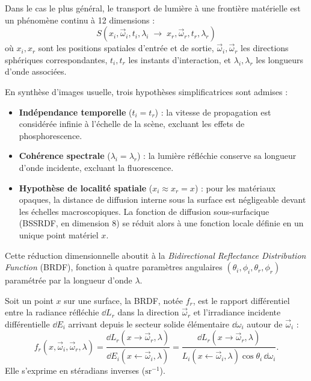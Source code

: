 Dans le cas le plus général, le transport de lumière à une frontière matérielle est un phénomène continu à 12 dimensions :
\begin{equation}
    S(x_i, \vec{\omega}_i, t_i, \lambda_i \;\to\; x_r, \vec{\omega}_r, t_r, \lambda_r)
\end{equation}
où $x_i, x_r$ sont les positions spatiales d'entrée et de sortie, $\vec{\omega}_i, \vec{\omega}_r$ les directions sphériques correspondantes, $t_i, t_r$ les instants d'interaction, et $\lambda_i, \lambda_r$ les longueurs d'onde associées.

\begin{proposition}[Simplification]
    En synthèse d'images usuelle, trois hypothèses simplificatrices sont admises :
    \begin{itemize}
        \item \textbf{Indépendance temporelle} ($t_i = t_r$) : la vitesse de propagation est considérée infinie à l'échelle de la scène, excluant les effets de phosphorescence.
        \item \textbf{Cohérence spectrale} ($\lambda_i = \lambda_r$) : la lumière réfléchie conserve sa longueur d'onde incidente, excluant la fluorescence.
        \item \textbf{Hypothèse de localité spatiale} ($x_i \approx x_r = x$) : pour les matériaux opaques, la distance de diffusion interne sous la surface est négligeable devant les échelles macroscopiques. La fonction de diffusion sous-surfacique (BSSRDF, en dimension 8) se réduit alors à une fonction locale définie en un unique point matériel $x$.
    \end{itemize}    
\end{proposition}

Cette réduction dimensionnelle aboutit à la \emph{Bidirectional Reflectance Distribution Function} (BRDF), fonction à quatre paramètres angulaires $(\theta_i, \phi_i, \theta_r, \phi_r)$ paramétrée par la longueur d'onde $\lambda$.

\begin{definition}[BRDF]
    Soit un point $x$ sur une surface, la BRDF, notée $f_r$, est le rapport différentiel entre la radiance réfléchie $\dd L_r$ dans la direction $\vec{\omega}_r$ et l'irradiance incidente différentielle $\dd E_i$ arrivant depuis le secteur solide élémentaire $\dd\omega_i$ autour de $\vec{\omega}_i$ :
    \begin{equation}
        f_r(x, \vec{\omega}_i, \vec{\omega}_r, \lambda) = \frac{\dd L_r(x \to \vec{\omega}_r, \lambda)}{\dd E_i(x \leftarrow \vec{\omega}_i, \lambda)} = \frac{\dd L_r(x \to \vec{\omega}_r, \lambda)}{L_i(x \leftarrow \vec{\omega}_i, \lambda) \cos\theta_i \, \dd\omega_i}.
    \end{equation}
    Elle s'exprime en stéradians inverses ($\mathrm{sr}^{-1}$).
\end{definition}

